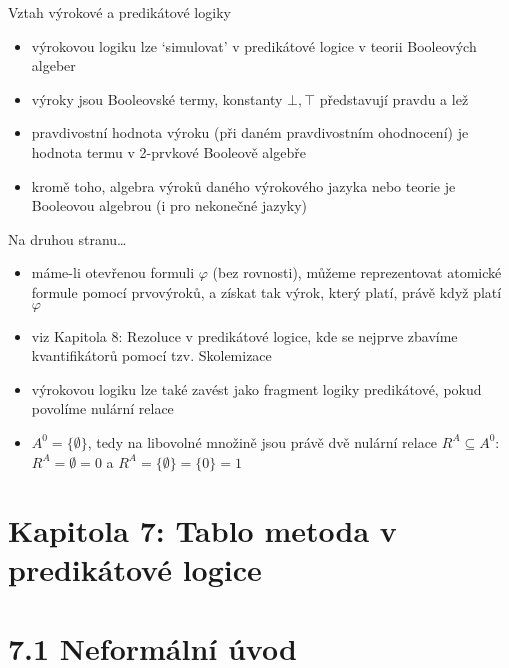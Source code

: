 \documentclass{beamer}
\begin{document}
\begin{frame}{Vztah výrokové a predikátové logiky}
   
    \pause
    \begin{itemize}
        \item výrokovou logiku lze `simulovat' v predikátové logice v teorii Booleových algeber\pause
        \item výroky jsou \alert{Booleovské termy}, konstanty $\bot,\top$ představují pravdu a lež\pause
        \item pravdivostní hodnota výroku (při daném pravdivostním ohodnocení) je hodnota termu v 2-prvkové Booleově algebře\pause
        \item kromě toho, \alert{algebra výroků} daného výrokového jazyka nebo teorie je Booleovou algebrou (i pro nekonečné jazyky)        
    \end{itemize}
    
\end{frame}


\begin{frame}{Na druhou stranu\dots}

    \pause
    \begin{itemize}
        \item máme-li \alert{otevřenou} formuli $\varphi$ (bez rovnosti), můžeme reprezentovat atomické formule pomocí prvovýroků, a získat tak výrok, který platí, právě když platí $\varphi$\pause
        \item viz Kapitola 8: Rezoluce v predikátové logice, kde se nejprve zbavíme kvantifikátorů pomocí tzv. \alert{Skolemizace}\pause
        \item výrokovou logiku lze také zavést jako fragment logiky predikátové, pokud povolíme \alert{nulární relace}\pause
        \item $A^0=\{\emptyset\}$, tedy na libovolné množině jsou právě dvě nulární relace $R^A\subseteq A^0$: $R^A=\emptyset=0$ a $R^A=\{\emptyset\}=\{0\}=1$
    \end{itemize}
        
\end{frame}


\section{\sc Kapitola 7: Tablo metoda v predikátové logice}


\section{7.1 Neformální úvod}
\end{document}
